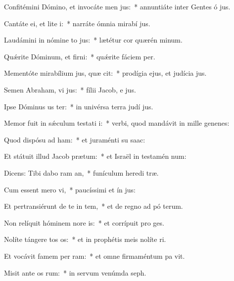 \item Confitémini Dómino, et invocáte men jus:~* annuntiáte inter Gentes ó jus.
\item Cantáte ei, et lite i:~* narráte ómnia mirabí jus.
\item Laudámini in nómine to jus:~* lætétur cor quærén minum.
\item Quǽrite Dóminum, et firni:~* quǽrite fáciem  per.
\item Mementóte mirabílium jus, quæ cit:~* prodígia ejus, et judícia  jus.
\item Semen Abraham, vi jus:~* fílii Jacob, e jus.
\item Ipse Dóminus us ter:~* in univérsa terra judí jus.
\item Memor fuit in sǽculum testati i:~* verbi, quod mandávit in mille genenes:
\item Quod dispósu ad ham:~* et juraménti su  saac:
\item Et státuit illud Jacob  prætum:~* et Israël in testamén num:
\item Dicens: Tibi dabo ram an,~* funículum heredi træ.
\item Cum essent mero vi,~* paucíssimi et ín jus:
\item Et pertransiérunt de te in tem,~* et de regno ad pó terum.
\item Non relíquit hóminem nore is:~* et corrípuit pro  ges.
\item Nolíte tángere tos os:~* et in prophétis meis nolíte ri.
\item Et vocávit famem per ram:~* et omne firmaméntum pa vit.
\item Misit ante os rum:~* in servum venúmda  seph.
